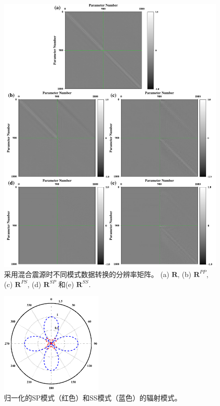 \begin{figure}[!htb]
    \begin{center}
        \includegraphics[width=12cm]{Figure/chapter02/ResoOpera/Fig/resolutionMN.pdf}
        \caption{
			采用混合震源时不同模式数据转换的分辨率矩阵。
            (a) $\mathbf{R}$, (b) $\mathbf{R}^{PP}$, (c) $\mathbf{R}^{PS}$, (d)
            $\mathbf{R}^{SP}$ 和(e)
            $\mathbf{R}^{SS}$.
    }
    \label{fig:ResoMN}
    \end{center}
\end{figure}

\begin{figure}[!htb]
    \begin{center}
        \includegraphics[width=5cm]{Figure/chapter02/radiationpattern/Fig/SPSS.pdf}
        \caption{
			归一化的SP模式（红色）和SS模式（蓝色）的辐射模式。
    }
    \label{fig:SPSS}
    \end{center}
\end{figure}
